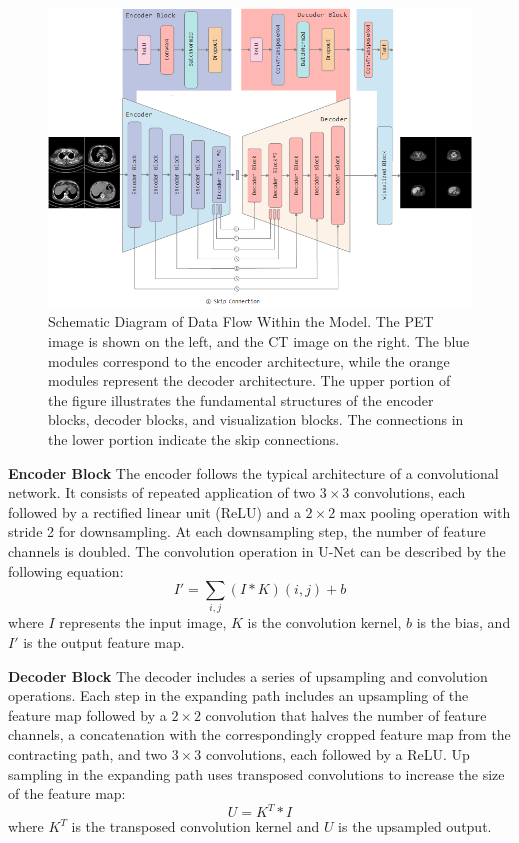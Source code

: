 \documentclass[twocolumn]{article}
\begin{document}
\begin{figure}[t!]
	\centering
	\includegraphics[width=1.0\linewidth]{u-net/lung/Encoder-Decoder-5layer-250406}
	\caption[architecture]{Schematic Diagram of Data Flow Within the Model. The PET image is shown on the left, and the CT image on the right. The blue modules correspond to the encoder architecture, while the orange modules represent the decoder architecture. The upper portion of the figure illustrates the fundamental structures of the encoder blocks, decoder blocks, and visualization blocks. The connections in the lower portion indicate the skip connections.}
	\label{fig:Encoder_Decoder_Pair}
\end{figure}

\textbf{Encoder Block} The encoder follows the typical architecture of a convolutional network. It consists of repeated application of two $3\times3$ convolutions, each followed by a rectified linear unit (ReLU) and a $2\times2$ max pooling operation with stride 2 for downsampling. At each downsampling step, the number of feature channels is doubled. The convolution operation in U-Net can be described by the following equation:
\[
	I' = \sum_{i,j} (I * K)(i,j) + b
\]
where \(I\) represents the input image, \(K\) is the convolution kernel, \(b\) is the bias, and \(I'\) is the output feature map.

\textbf{Decoder Block} The decoder includes a series of upsampling and convolution operations. Each step in the expanding path includes an upsampling of the feature map followed by a $2\times2$ convolution that halves the number of feature channels, a concatenation with the correspondingly cropped feature map from the contracting path, and two $3\times3$ convolutions, each followed by a ReLU. Up sampling in the expanding path uses transposed convolutions to increase the size of the feature map:
\[
	U = K^T * I
\]
where \(K^T\) is the transposed convolution kernel and \(U\) is the upsampled output.
\end{document}
